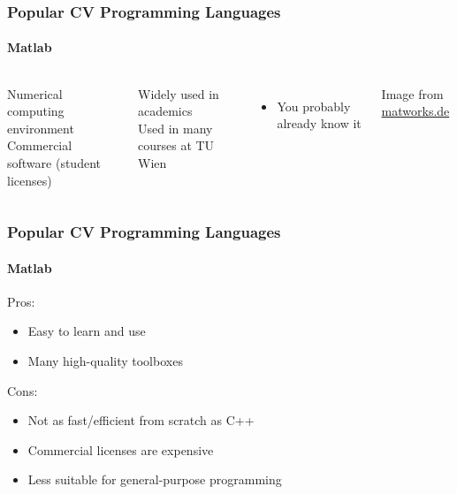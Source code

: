 \documentclass[xetex,professionalfont]{beamer}
\begin{document}
\begin{frame}
\frametitle{Popular CV Programming Languages}
\framesubtitle{Matlab}

\begin{columns}

Numerical computing environment \\
Commercial software (student licenses)

\bigskip
Widely used in academics \\
Used in many courses at TU Wien
\begin{itemize}
	\item You probably already know it
\end{itemize}


\begin{center}
{
	{\centering Image from \url{matworks.de}}}
\end{center}

\end{columns}

\end{frame}


\begin{frame}
\frametitle{Popular CV Programming Languages}
\framesubtitle{Matlab}

Pros:
\begin{itemize}
	\item Easy to learn and use
	\item Many high-quality toolboxes
\end{itemize}

\bigskip
Cons:
\begin{itemize}
	\item Not as fast/efficient from scratch as C++ %
	\item Commercial licenses are expensive
	\item Less suitable for general-purpose programming
\end{itemize}

\end{frame}
\end{document}
